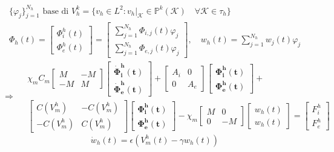 \documentclass[a4paper]{article}
\theoremstyle{definition}
\begin{document}
\begin{equation*}
\begin{gathered}
\{\varphi_j\}_{j=1}^{N_h} \text{ base di } V_h^k = \{v_h \in L^2 : v_h|_\mathcal{K} \in \mathbb{P}^{k}(\mathcal{K})  \quad \forall \mathcal{K} \in \tau_h \}
\\
\Phi_h(t) = \begin{bmatrix} \Phi_i^h(t) \\ \Phi_e^h(t) \end{bmatrix} = \begin {bmatrix}\sum_{j=1}^{N_h} \Phi_{i,j}(t)\varphi_j \\ \sum_{j=1}^{N_h} \Phi_{e,j}(t)\varphi_j \end{bmatrix},
 \quad w_h(t) = \sum_{j=1}^{N_h}w_j(t)\varphi_j
\end{gathered}
\end{equation*}
\vspace{3mm}
\begin{equation}
\Rightarrow \quad
\boxed{
\begin{gathered}
 \chi_mC_m \begin{bmatrix}M &-M \\ -M & M \end{bmatrix}
	\begin{bmatrix}\bm{\dot{\Phi}_i^h(t)} \\ \bm{\dot{\Phi}_e^h(t)} \end{bmatrix}
	 + \begin{bmatrix}A_i & 0 \\ 0 & A_e \end{bmatrix}
	 \begin{bmatrix}\bm{\Phi_i^h(t)} \\ \bm{\Phi_e^h(t)} \end{bmatrix} +\\
	   \begin{bmatrix}C(V_m^h) & -C(V_m^h) \\ -C(V_m^h) & C(V_m^h) \end{bmatrix} 
	   \begin{bmatrix} \bm{\Phi_i^h(t)} \\ \bm{\Phi_e^h(t)}  \end{bmatrix} 
	   -\chi_m \begin{bmatrix}M & 0 \\ 0 & -M \end{bmatrix} 
	   	\begin{bmatrix}w_h(t) \\ w_h(t) \end{bmatrix} = 
	   	\begin{bmatrix} F_i^h \\ F_e^h\end{bmatrix}
\end{gathered}
}
\end{equation}
\begin{equation}
\boxed{\dot{w}_h(t) = \epsilon(V_m^h(t) - \gamma w_h(t))}
\end{equation}
\vspace{5mm}
\end{document}
